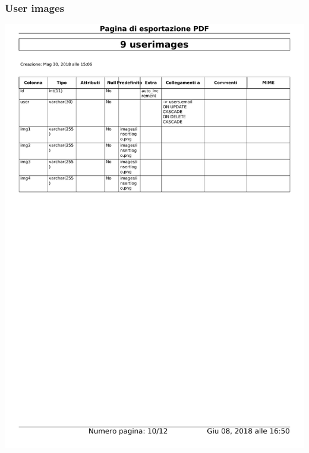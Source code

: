 \documentclass{article}
\begin{document}
    \subsubsection{User images}
    \begin{center}
        \includegraphics[width=15cm]{images/userimages}
    \end{center}
\end{document}
